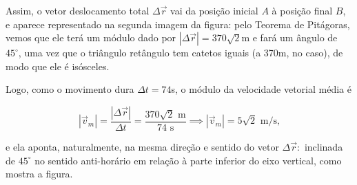 \begin{exemplo}[Nível I]
Assim, o vetor deslocamento total $\Delta \vec{r}$ vai da posição inicial $A$ à posição final $B$, e aparece representado na segunda imagem da figura: pelo Teorema de Pitágoras, vemos que ele terá um módulo dado por $|\Delta \vec{r}|=370 \sqrt{2}$m e fará um ângulo de $45^\circ$, uma vez que o triângulo retângulo tem catetos iguais (a 370m, no caso), de modo que ele é isósceles.

Logo, como o movimento dura $\Delta t = 74$s, o módulo da velocidade vetorial média é

$$ |\vec{v}_m| = \dfrac{|\Delta \vec{r}|}{\Delta t} = \dfrac{370\sqrt2 \text{ m}}{74 \text{ s}} \implies \boxed{|\vec{v}_m| =5\sqrt2 \text{ m/s,}} $$

\noindent e ela aponta, naturalmente, na mesma direção e sentido do vetor $\Delta \vec{r}:$ inclinada de $45^\circ$ no sentido anti-horário em relação à parte inferior do eixo vertical, como mostra a figura.

    
\end{exemplo}

\vspace{0.3cm}



